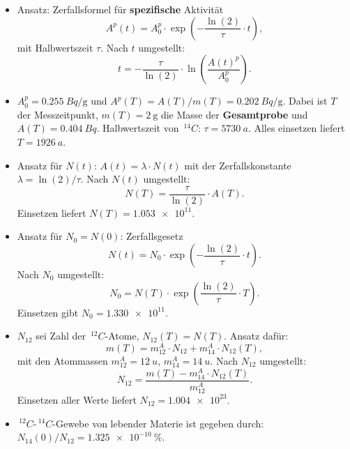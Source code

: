 \documentclass{subfiles}
\begin{document}
\subaufgabe{}
\begin{itemize}
        \item Ansatz: Zerfallsformel für \textbf{spezifische} Aktivität
        \[
                A^p(t) = A_0^p\cdot\exp(-\frac{\ln(2)}{\tau}\cdot t),        
        \]
        mit Halbwertszeit $\tau$. Nach $t$ umgestellt:
        \[
                t = -\frac{\tau}{\ln(2)}\cdot\ln(\frac{A(t)^p}{A_0^p}).        
        \]
        \item $A_0^p = \SI{0.255}{Bq\per\g}$ und $A^p(T) = A(T) / m(T) = \SI{0.202}{Bq\per \g}$. Dabei ist $T$ der Messzeitpunkt, $m(T)=\SI{2}{\g}$ die Masse der \textbf{Gesamtprobe} und $A(T)=\SI{0.404}{Bq}$. Halbwertszeit von $\,^{14}C$: $\tau=\SI{5730}{a}$. Alles einsetzen liefert \underline{$T=\SI{1926}{a}$}.
 \end{itemize}

 \subaufgabe{}
 \begin{itemize}
        \item Ansatz für $N(t)$: $A(t) = \lambda\cdot N(t)$ mit der Zerfallskonstante $\lambda = \ln(2) / \tau$. Nach $N(t)$ umgestellt:
        \[
                N(T) = \frac{\tau}{\ln(2)}\cdot A(T).
        \]
        Einsetzen liefert \underline{$N(T) = \num{1.053e11}$}.
        \item Ansatz für $N_0 = N(0)$: Zerfallsgesetz
        \[
                N(t) = N_0\cdot\exp(-\frac{\ln(2)}{\tau}\cdot t).        
        \]
        Nach $N_0$ umgestellt:
        \[
                N_0 = N(T)\cdot\exp(\frac{\ln(2)}{\tau}\cdot T).
        \]
        Einsetzen gibt \underline{$N_0 = \num{1.330e11}$}.
 \end{itemize}

\subaufgabe{}
\begin{itemize}
        \item $N_{12}$ sei Zahl der $\,^{12}C$-Atome, $N_{12}(T) = N(T)$. Ansatz dafür:
        \[
                m(T) = m^A_{12}\cdot N_{12} + m^A_{14}\cdot N_{12}(T),
        \]
        mit den Atommassen $m^A_{12}=\SI{12}{u}$, $m^A_{14}=\SI{14}{u}$. Nach $N_12$ umgestellt:
        \[
                N_{12} = \frac{m(T) - m^A_{14}\cdot N_{12}(T)}{m^A_12}.        
        \]
        Einsetzen aller Werte liefert \underline{$N_12 = \num{1.004e23}$}.
        \item $\,^{12}C$-$\,^{14}C$-Gewebe von lebender Materie ist gegeben durch: \underline{$N_{14}(0) / N_{12} = \SI{1.325e-10}{\percent}$}.
\end{itemize}
\end{document}
